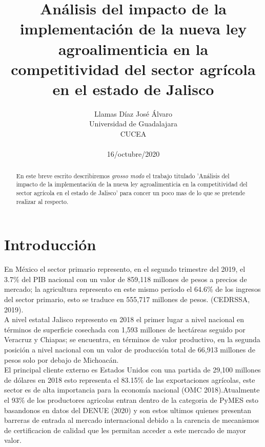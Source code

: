 \documentclass[a4paper]{article}
\title{Análisis del impacto de la implementación de la nueva ley agroalimenticia en la competitividad del sector agrícola en el estado de Jalisco}
\author{Llamas Díaz José Álvaro\\
  \small Universidad de Guadalajara\\
  \small CUCEA\\
  \date\small{16/octubre/2020}
}
\begin{document}
\maketitle

\begin{abstract}
En este breve escrito describiremos \textit{grosso modo} el trabajo titulado 'Análisis del impacto de la implementación de la nueva ley agroalimenticia en la competitividad del sector agrícola en el estado de Jalisco' para concer un poco mas de lo que se pretende realizar al respecto.
\end{abstract}

\section{Introducci\'on}

En México el sector primario represento, en el segundo trimestre del 2019, el 3.7\% del PIB nacional con un valor de 859,118 millones de pesos a precios de mercado; la agricultura represento en este mismo periodo el 64.6\% de los ingresos del sector primario, esto se traduce en 555,717 millones de pesos. \cite{Ced19}(CEDRSSA, 2019). \\

A nivel estatal Jalisco represento en 2018 el primer lugar a nivel nacional en términos de superficie cosechada con 1,593 millones de hectáreas seguido por Veracruz y Chiapas; se encuentra, en términos de valor productivo, en la segunda posición a nivel nacional con un valor de producción total de 66,913 millones de pesos solo por debajo de Michoacán.\\

El principal cliente externo es Estados Unidos con una partida de 29,100 millones de dólares en 2018 esto representa el 83.15\% de las exportaciones agrícolas, este sector es de alta importancia para la economía nacional \cite{OMC18}(OMC 2018).Atualmente el 93\% de los productores agricolas entran dentro de la categoria de PyMES esto basandonos en datos del \cite{Den20}DENUE (2020) y son estos ultimos quienes presentan barreras de entrada al mercado internacional debido a la carencia de mecanismos de certificacion de calidad que les permitan acceder a este mercado de mayor valor.\\
\end{document}
